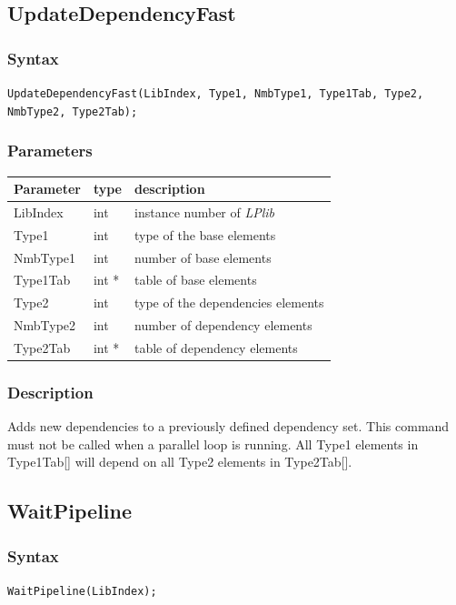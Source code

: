 \documentclass[a4paper,12pt]{article}
\begin{document}
\subsection{UpdateDependencyFast}

\subsubsection*{Syntax}
\tt{UpdateDependencyFast(LibIndex, Type1, NmbType1, Type1Tab, Type2, NmbType2, Type2Tab);}
\normalfont

\subsubsection*{Parameters}
\begin{tabular}{|m{2cm}|m{1.5cm}|m{10.5cm}|}
\hline
Parameter  & type   & description \\
\hline
LibIndex   & int    & instance number of \emph{LPlib} \\
\hline
Type1      & int    & type of the base elements \\
\hline
NmbType1   & int    & number of base elements \\
\hline
Type1Tab   & int *  & table of base elements \\
\hline
Type2      & int    & type of the dependencies elements \\
\hline
NmbType2   & int    & number of dependency elements \\
\hline
Type2Tab   & int *  & table of dependency elements \\
\hline
\end{tabular}

\subsubsection*{Description}
Adds new dependencies to a previously defined dependency set. This command must not be called when a parallel loop is running. All Type1 elements in Type1Tab[] will depend on all Type2 elements in Type2Tab[].


\subsection{WaitPipeline}

\subsubsection*{Syntax}
\tt{WaitPipeline(LibIndex);}
\normalfont
\end{document}
